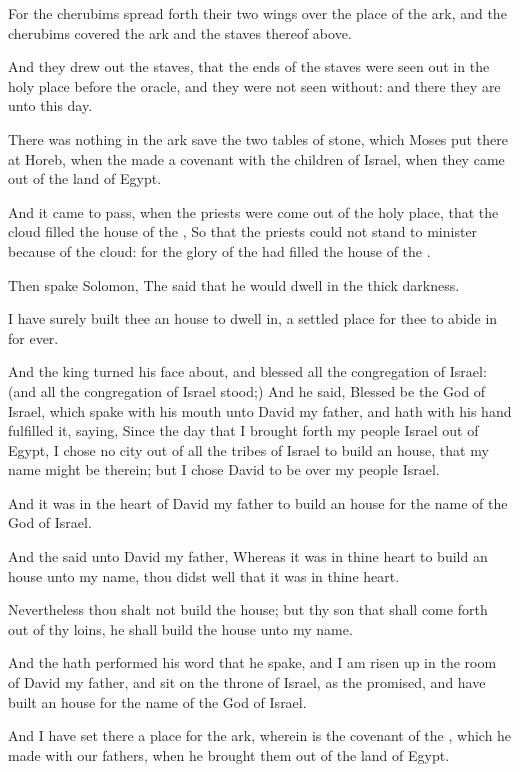 \verse For the cherubims spread forth their two wings over the place of the ark, and the cherubims covered the ark and the staves thereof above.

\verse And they drew out the staves, that the ends of the staves were seen out in the holy place before the oracle, and they were not seen without: and there they are unto this day.

\verse There was nothing in the ark save the two tables of stone, which Moses put there at Horeb, when the \LORD made a covenant with the children of Israel, when they came out of the land of Egypt.

\verse And it came to pass, when the priests were come out of the holy place, that the cloud filled the house of the \LORD, \verse So that the priests could not stand to minister because of the cloud: for the glory of the \LORD had filled the house of the \LORD.

\verse Then spake Solomon, The \LORD said that he would dwell in the thick darkness.

\verse I have surely built thee an house to dwell in, a settled place for thee to abide in for ever.

\verse And the king turned his face about, and blessed all the congregation of Israel: (and all the congregation of Israel stood;) \verse And he said, Blessed be the \LORD God of Israel, which spake with his mouth unto David my father, and hath with his hand fulfilled it, saying, \verse Since the day that I brought forth my people Israel out of Egypt, I chose no city out of all the tribes of Israel to build an house, that my name might be therein; but I chose David to be over my people Israel.

\verse And it was in the heart of David my father to build an house for the name of the \LORD God of Israel.

\verse And the \LORD said unto David my father, Whereas it was in thine heart to build an house unto my name, thou didst well that it was in thine heart.

\verse Nevertheless thou shalt not build the house; but thy son that shall come forth out of thy loins, he shall build the house unto my name.

\verse And the \LORD hath performed his word that he spake, and I am risen up in the room of David my father, and sit on the throne of Israel, as the \LORD promised, and have built an house for the name of the \LORD God of Israel.

\verse And I have set there a place for the ark, wherein is the covenant of the \LORD, which he made with our fathers, when he brought them out of the land of Egypt.

